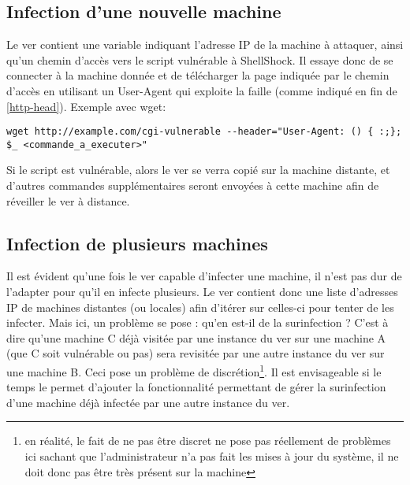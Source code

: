\documentclass[]{projet-M1}
\begin{document}
\subsection{Infection d'une nouvelle machine}
Le ver contient une variable indiquant l'adresse IP de la machine à attaquer, ainsi qu'un chemin d'accès vers le script vulnérable à ShellShock. Il essaye donc de se connecter à la machine donnée et de télécharger la page indiquée par le chemin d'accès en utilisant un User-Agent qui exploite la faille (comme indiqué en fin de \ref{http-head}).
Exemple avec \gls{wget}: 
\begin{lstlisting}
wget http://example.com/cgi-vulnerable --header="User-Agent: () { :;}; $_ <commande_a_executer>"
\end{lstlisting} 
Si le script est vulnérable, alors le ver se verra copié sur la machine distante, et d'autres commandes supplémentaires seront envoyées à cette machine afin de réveiller le ver à distance.

\subsection{Infection de plusieurs machines}
Il est évident qu'une fois le ver capable d'infecter une machine, il n'est pas dur de l'adapter pour qu'il en infecte plusieurs. Le ver contient donc une liste d'adresses IP de machines distantes (ou locales) afin d'itérer sur celles-ci pour tenter de les infecter.
Mais ici, un problème se pose : qu'en est-il de la surinfection ? C'est à dire qu'une machine C déjà visitée par une instance du ver sur une machine A (que C soit vulnérable ou pas) sera revisitée par une autre instance du ver sur une machine B. Ceci pose un problème de discrétion\footnote{en réalité, le fait de ne pas être discret ne pose pas réellement de problèmes ici sachant que l'administrateur n'a pas fait les mises à jour du système, il ne doit donc pas être très présent sur la machine}. Il est envisageable si le temps le permet d'ajouter la fonctionnalité permettant de gérer la surinfection d'une machine déjà infectée par une autre instance du ver.
\end{document}
